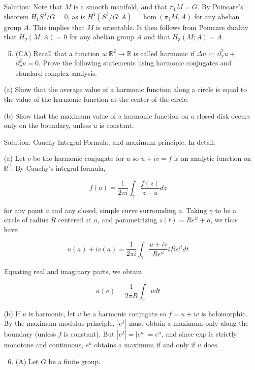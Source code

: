 \documentclass[10pt]{article}
\begin{document}
Solution: Note that $M$ is a smooth manifold, and that $\pi_{1} M=G$. By Poincare's theorem $H_{1} S^{3} / G=0$, as is $H^{1}\left(S^{3} / G ; A\right)=\operatorname{hom}\left(\pi_{1} M, A\right)$ for
any abelian group $A$. This implies that $M$ is orientable. It then follows from Poincare duality that $H_{2}(M ; A)=0$ for any abelian group $A$ and that $H_{3}(M ; A)=A$.

\begin{enumerate}
  \setcounter{enumi}{4}
  \item (CA) Recall that a function $u: \mathbb{R}^{2} \rightarrow \mathbb{R}$ is called harmonic if $\Delta u:=\partial_{x}^{2} u+$ $\partial_{y}^{2} u=0$. Prove the following statements using harmonic conjugates and standard complex analysis.
\end{enumerate}

(a) Show that the average value of a harmonic function along a circle is equal to the value of the harmonic function at the center of the circle.

(b) Show that the maximum value of a harmonic function on a closed disk occurs only on the boundary, unless $u$ is constant.

Solution: Cauchy Integral Formula, and maximum principle. In detail:

(a) Let $v$ be the harmonic conjugate for $u$ so $u+i v=f$ is an analytic function on $\mathbb{R}^{2}$. By Cauchy's integral formula,

$$
f(a)=\frac{1}{2 \pi i} \int_{\gamma} \frac{f(z)}{z-a} d z
$$

for any point $a$ and any closed, simple curve surrounding $a$. Taking $\gamma$ to be a circle of radius $R$ centered at $a$, and parametrizing $z(t)=R e^{i t}+a$, we thus have

$$
u(a)+i v(a)=\frac{1}{2 \pi i} \int_{\gamma} \frac{u+i v}{R e^{i t}} i R e^{i t} d t
$$

Equating real and imaginary parts, we obtain

$$
u(a)=\frac{1}{2 \pi R} \int_{\gamma} u d t
$$

(b) If $u$ is harmonic, let $v$ be a harmonic conjugate so $f=u+i v$ is holomorphic. By the maximum modulus principle, $\left|e^{f}\right|$ must obtain a maximum only along the boundary (unless $f$ is constant). But $\left|e^{f}\right|=\left|e^{u}\right|=e^{u}$, and since exp is strictly monotone and continuous, $e^{u}$ obtains a maximum if and only if $u$ does.

\begin{enumerate}
  \setcounter{enumi}{5}
  \item (A) Let $G$ be a finite group.
\end{enumerate}
\end{document}
